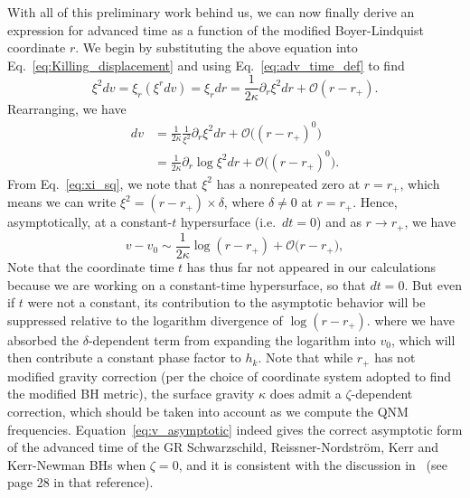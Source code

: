 \documentclass[aps,prx,amsmath,floats,floatfix,twocolumn,
  superscriptaddress,nofootinbib,showpacs]{revtex4-1}
\begin{document}
With all of this preliminary work behind us, we can now finally derive an expression for advanced time as a function of the modified Boyer-Lindquist coordinate $r$. We begin by substituting the above equation into Eq.~\eqref{eq:Killing_displacement} and using Eq.~\eqref{eq:adv_time_def} to find
\begin{equation}
 \xi^2 d v = \xi_r \left( \xi^r dv \right) = \xi_r dr = \frac{1}{2 \kappa} \partial_{r} \xi^2 dr + \mathcal{O}(r-r_+). 
\end{equation}
Rearranging, we have 
\begin{equation}
\begin{split}
d v & = \frac{1}{2 \kappa} \frac{1}{\xi^2} \partial_{r} \xi^2 dr + \mathcal{O}\Big( (r-r_+)^0 \Big) \\
& = \frac{1}{2 \kappa} \partial_{r} \log \xi^2 dr + \mathcal{O}\Big( (r-r_+)^0 \Big). 
\end{split}
\end{equation}
From Eq.~\eqref{eq:xi_sq}, we note that $\xi^2$ has a nonrepeated zero at $r=r_+$, which means we can write $\xi^2 = (r-r_+) \times \delta$, where $\delta \neq 0 $ at $r=r_+$. 
Hence, asymptotically, at a constant-$t$ hypersurface (i.e.~$dt = 0$) and as $r \rightarrow r_+$, we have 
\begin{equation}\label{eq:v_asymptotic}
v - v_0 \sim \frac{1}{2 \kappa} \log(r-r_+) + \mathcal{O}\Big(r-r_+\Big), 
\end{equation}
Note that the coordinate time $t$ has thus far not appeared in our calculations because we are working on a constant-time hypersurface, so that $dt = 0$. 
But even if $t$ were not a constant, its contribution to the asymptotic behavior will be suppressed relative to the logarithm divergence of $\log (r-r_+)$. where we have absorbed the $\delta$-dependent term from expanding the logarithm into $v_0$, which will then contribute a constant phase factor to $h_k$.
Note that while $r_+$ has not modified gravity correction (per the choice of coordinate system adopted to find the modified BH metric), the surface gravity $\kappa$ does admit a $\zeta$-dependent correction, which should be taken into account as we compute the QNM frequencies. 
Equation~\eqref{eq:v_asymptotic} indeed gives the correct asymptotic form of the advanced time of the GR Schwarzschild, Reissner-Nordstr\"{o}m, Kerr and Kerr-Newman BHs \cite{Carter:1968rr} when $\zeta = 0$, and it is consistent with the discussion in~\cite{Franzen:2020gke} (see page 28 in that reference). 
\end{document}
